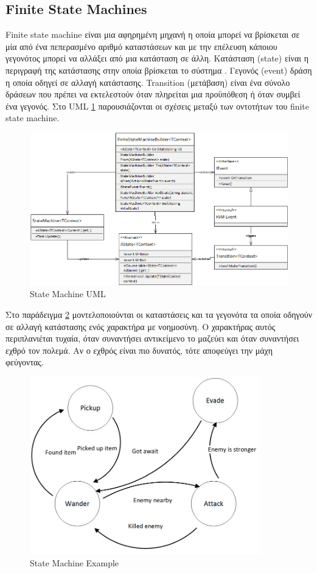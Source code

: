 \subsection{Finite State Machines}	
 Finite state machine είναι μια αφηρημένη μηχανή η οποία μπορεί να βρίσκεται σε μία από ένα πεπερασμένο αριθμό καταστάσεων και με την επέλευση κάποιου γεγονότος μπορεί να αλλάξει από μια κατάσταση σε άλλη. 
 Κατάσταση (state) είναι η περιγραφή της κατάστασης στην οποία βρίσκεται το σύστημα \cite{gill1962introduction}.
 Γεγονός (event) δράση η οποία οδηγεί σε αλλαγή κατάστασης.
 Transition (μετάβαση) είναι ένα σύνολο δράσεων που πρέπει να εκτελεστούν όταν πληρείται μια προϋπόθεση ή όταν συμβεί ένα γεγονός. Στο \gls{UML} \ref{fig:state_machine_uml} παρουσιάζονται οι σχέσεις μεταξύ των οντοτήτων του finite state machine.
 
\begin{figure}[h!]
	\centering
	\includegraphics[width=165mm]{Images/state_machine_uml}
	\caption{State Machine UML}
	\label{fig:state_machine_uml}
\end{figure}	

Στο παράδειγμα \ref{fig:state_machine_example} μοντελοποιούνται οι καταστάσεις και τα γεγονότα τα οποία οδηγούν σε αλλαγή κατάστασης ενός χαρακτήρα με νοημοσύνη. Ο χαρακτήρας αυτός περιπλανιέται τυχαία, όταν συναντήσει αντικείμενο το μαζεύει και όταν συναντήσει εχθρό τον πολεμά. Αν ο εχθρός είναι πιο δυνατός, τότε αποφεύγει την μάχη φεύγοντας.
\begin{figure}[h!]
	\centering
	\includegraphics[width=100mm]{Images/ingame_fsm_example}
	\caption{State Machine Example}
	\label{fig:state_machine_example}
\end{figure}

